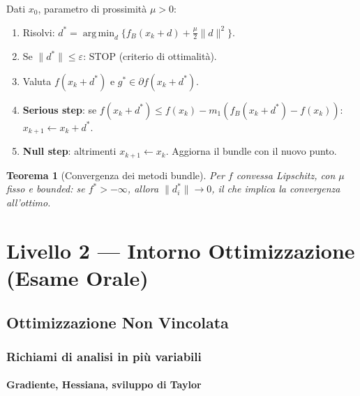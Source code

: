 \documentclass[11pt, a4paper, twoside]{book}
\theoremstyle{definition}
\theoremstyle{plain}
\newtheorem{thm}{Teorema}[chapter]
\theoremstyle{remark}
\DeclareMathOperator*{\argmin}{arg\,min}
\newcommand{\eps}{\varepsilon}
\begin{document}
\begin{algobox}
Dati $x_0$, parametro di prossimità $\mu > 0$:
\begin{enumerate}
  \item Risolvi: $d^* = \argmin_d \{f_B(x_k + d) + \frac{\mu}{2}\|d\|^2\}$.
  \item Se $\|d^*\| \leq \eps$: STOP (criterio di ottimalità).
  \item Valuta $f(x_k + d^*)$ e $g^* \in \partial f(x_k + d^*)$.
  \item \textbf{Serious step}: se $f(x_k + d^*) \leq f(x_k) - m_1(f_B(x_k + d^*) - f(x_k))$: $x_{k+1} \leftarrow x_k + d^*$.
  \item \textbf{Null step}: altrimenti $x_{k+1} \leftarrow x_k$. Aggiorna il bundle con il nuovo punto.
\end{enumerate}
\end{algobox}

\begin{thm}[Convergenza dei metodi bundle]
Per $f$ convessa Lipschitz, con $\mu$ fisso e bounded: se $f^* > -\infty$, allora $\|d^*_i\| \to 0$, il che implica la convergenza all'ottimo.
\end{thm}


\part{Livello 2 --- Intorno Ottimizzazione (Esame Orale)}
\label{part:L2-opt}

\chapter{Ottimizzazione Non Vincolata}

\section{Richiami di analisi in più variabili}

\subsection{Gradiente, Hessiana, sviluppo di Taylor}
\end{document}
